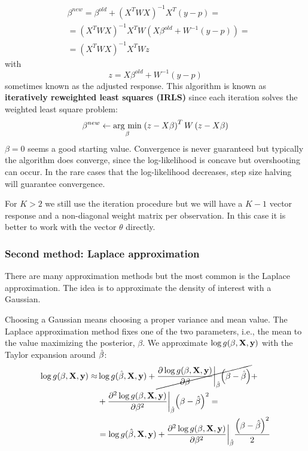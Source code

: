 \begin{equation}
\begin{aligned}
&\beta^{new} = \beta^{old} +(X^TWX)^{-1}X^T(y-p) = \\
&=(X^TWX)^{-1}X^TW\left(X\beta^{old}+W^{-1} \left(y-p\right)\right) =\\
&= \left(X^TWX\right)^{-1} X^TWz
\end{aligned}
\end{equation}
with
\begin{equation}
z = X\beta^{old}+ W^{-1} (y-p)
\end{equation}
sometimes known as the adjusted response. This algorithm is known as \textbf{iteratively reweighted least squares (IRLS)} since each iteration solves the weighted least square problem:
\begin{equation}
\beta^{new} \leftarrow \underset{\beta}{\operatorname{arg}\,\operatorname{min}}\;{\left(z-X\beta\right)^TW\left(z-X\beta\right)}
\end{equation}
$\beta=0$ seems a good starting value. Convergence is never guaranteed but typically the algorithm does converge, since the log-likelihood is concave but overshooting can occur. In the rare cases that the log-likelihood decreases, step size halving will guarantee convergence.

For $K>2$ we still use the iteration procedure but we will have a $K-1$ vector response and a non-diagonal weight matrix per observation. In this case it is better to work with the vector $\theta$ directly.

\subsubsection{Second method: Laplace approximation}
There are many approximation methods but the most common is the Laplace approximation. The idea is to approximate the density of interest with a Gaussian.

Choosing a Gaussian means choosing a proper variance and mean value. The Laplace approximation method fixes one of the two parameters, i.e., the mean to the value maximizing the posterior, $\beta$. We approximate $\log g(\mathbf{\beta},\mathrm{\mathbf{X}},\mathbf{y})$ with the Taylor expansion around $\hat{\mathbf{\beta}}$:
\begin{equation}
\label{Taylor}
\begin{aligned}
\log g(\be,\X,\y) \approx &\log g(\hbe,\X,\y) + \cancel{\frac{ \partial \log g(\be,\X,\y)}{\partial \be}\bigg\rvert_{\hbe}\br{\be -\hbe}} + \\
&+ \frac{ \partial^2 \log g(\be,\X,\y)}{\partial \be^2}\bigg\rvert_{\hbe}\br{\be -\hbe}^2 =\\
&=\log g(\hbe,\X,\y)+ \frac{ \partial^2 \log g(\be,\X,\y)}{\partial \be^2}\bigg\rvert_{\hbe}\frac{\br{\be -\hbe}^2}{2}
\end{aligned}
\end{equation}

